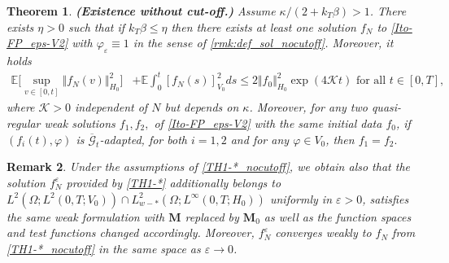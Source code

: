 \documentclass[a4paper,12pt, reqno]{amsart}
\newcommand{\E}{\ensuremath{\mathbb{E}}}
\newtheorem{theorem}{Theorem}
\newtheorem{remark}[theorem]{Remark}
\newcommand{\M}{\mathbf{M}}
\renewcommand{\k}{\kappa}
\begin{document}
    \begin{theorem}\label{TH1-*_nocutoff}\textbf{(Existence without cut-off.)} Assume $\kappa /(2+ k_T \beta) >1$. There exists $\eta>0$ such that if $k_T\beta \le \eta$ then there exists  at    least   one     solution $f_N$ to  \eqref{Ito-FP_eps-V2} with $\varphi_\varepsilon\equiv 1$ in the sense of  \autoref{rmk:def_sol_nocutoff}. Moreover,  it holds 
\begin{align}\label{estimate-solution}
 \E\Big[\sup_{v\in[0,t]} \Vert f_N(v)\Vert_{H_0}^2  \Big]&+\E\int_0^t [f_N(s)]_{V_0}^2ds\leq 2\Vert f_{0}\Vert_{H_0}^2\exp{(4\mathcal{K} t)} \text{ for all } t\in [0,T],
\end{align}
where $\mathcal{K}>0$ independent of $N$ but depends on $\k$. 
Moreover, for any two quasi-regular weak   solutions $f_1, f_2,$   of  \eqref{Ito-FP_eps-V2}  with    the same    initial data    $f_0$,  if   $(f_i(t),\varphi)$    is  $\overline{\mathcal{G}}_t$-adapted, for both    $i=1,2$ and for    any $\varphi\in V_0$, then   $f_1=f_2.$
\end{theorem}
\begin{remark}
    Under the assumptions of \autoref{TH1-*_nocutoff}, we obtain also that the solution $f^{\varepsilon}_N $ provided by \autoref{TH1-*} additionally belongs to $L^2(\Omega; L^2(0, T; V_0)) \cap L^2_{w-*}(\Omega; L^\infty(0, T; H_0))$ uniformly in $\varepsilon>0$, satisfies the same weak formulation with $\M$ replaced by $\M_0$ as well as  the function spaces and test functions changed accordingly.  Moreover, $f^{\varepsilon}_N $ converges weakly to $f_N$ from \autoref{TH1-*_nocutoff} in the same space as $\varepsilon\rightarrow 0$. 
\end{remark}
\end{document}
